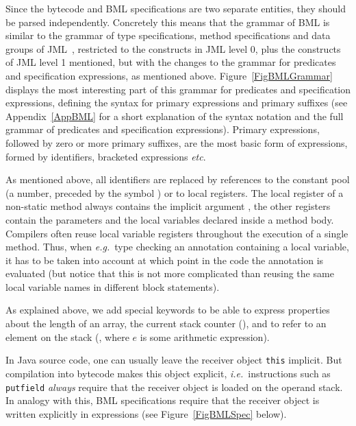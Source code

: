 Since the bytecode and BML specifications are two separate entities,
they should be parsed independently. Concretely this means that the
grammar of BML is similar to the grammar of type specifications,
method specifications and data groups of JML~\cite[\S A.5, A.6,
A.7]{JMLReferenceManual05}, restricted to the constructs in JML level
0, plus the constructs of JML level 1 mentioned, but with the changes
to the grammar for predicates and specification expressions, as
mentioned above. Figure~\ref{FigBMLGrammar} displays the most
interesting part of this grammar for predicates and specification
expressions, defining the syntax for primary expressions and primary
suffixes (see Appendix~\ref{AppBML} for a short explanation of the
syntax notation and the full grammar of predicates and specification
expressions). Primary expressions, followed by zero or more primary
suffixes, are the most basic form of expressions, formed by
identifiers, bracketed expressions
\emph{etc}. %

As mentioned above, all identifiers are replaced by references to the
constant pool (a number, preceded by the symbol
\codeHook{\#}) or to local registers. The local register 
of a non-static method always contains the implicit argument
, the other registers contain the parameters and the
local variables declared inside a method body. Compilers often reuse
local variable registers throughout the execution of a single
method. Thus, when \emph{e.g.}\ type checking an annotation containing
a local variable, it has to be taken into account at which point in
the code the annotation is evaluated (but notice that this is not more
complicated than reusing the same local variable names in different
block statements). 

As explained above, we add special keywords to be able to express
properties about the length of an array, the current stack counter
(), and to refer to an element on the stack
(, where \(e\) is some arithmetic expression).

In Java source code, one can usually leave the receiver object
\texttt{this} implicit. But compilation into bytecode makes this
object explicit, \emph{i.e.}\ instructions such as \texttt{putfield}
\emph{always} require that the receiver object is loaded on the
operand stack. In analogy with this, BML specifications require that
the receiver object is written explicitly in expressions (see
Figure~\ref{FigBMLSpec} below). 


